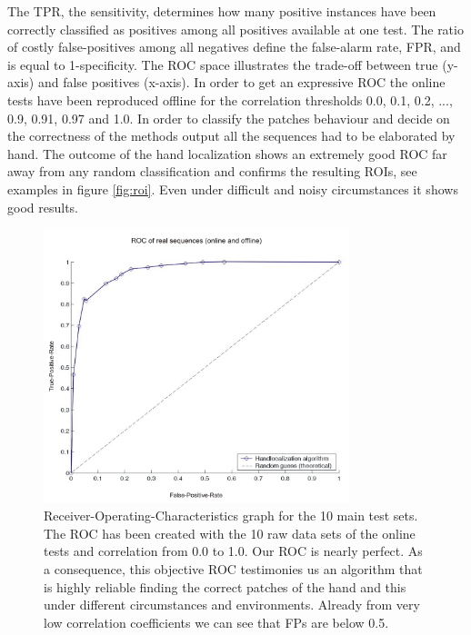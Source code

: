 \documentclass[conference]{IEEEtran}
\begin{document}
The TPR, the sensitivity, determines how many positive instances have been correctly classified as positives among all positives available at one test. The ratio of costly false-positives among all negatives define the false-alarm rate, FPR, and is equal to 1-specificity. %
The ROC space illustrates the trade-off between true (y-axis) and false positives (x-axis). In order to get an expressive ROC the online tests have been reproduced offline for the correlation thresholds 0.0, 0.1, 0.2, ..., 0.9, 0.91, 0.97 and 1.0. In order to classify the patches behaviour and decide on the correctness of the methods output all the sequences had to be elaborated by hand. The outcome of the hand localization shows an extremely good ROC far away from any random classification and confirms the resulting ROIs, see examples in figure \ref{fig:roi}. Even under difficult and noisy circumstances it shows good results.
%
\begin{figure}
	\begin{center}
		\includegraphics[width=3.5in]{imgs/results/roc.pdf}
			\caption[Receiver-Operating-Characteristics graph for the 10 main test sets. ]{Receiver-Operating-Characteristics graph for the 10 main test sets. The ROC has been created with the 10 raw data sets of the online tests and correlation from 0.0 to 1.0. Our ROC is nearly perfect. As a consequence, this objective ROC testimonies us an algorithm that is highly reliable finding the correct patches of the hand and this under different circumstances and environments. Already from very low correlation coefficients we can see that FPs are below 0.5. }
			\label{fig:result:roc}
	\end{center}
\end{figure}
%
%
\end{document}
